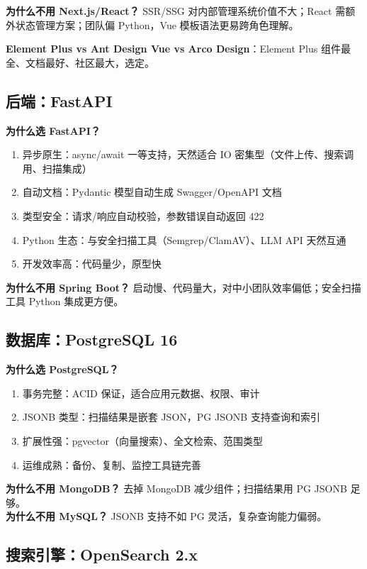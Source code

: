 \documentclass[11pt,a4paper]{article}
\begin{document}
\textbf{为什么不用 Next.js/React？} SSR/SSG 对内部管理系统价值不大；React 需额外状态管理方案；团队偏 Python，Vue 模板语法更易跨角色理解。

\textbf{Element Plus vs Ant Design Vue vs Arco Design}：Element Plus 组件最全、文档最好、社区最大，选定。

\subsection{后端：FastAPI}

\textbf{为什么选 FastAPI？}

\begin{enumerate}[nosep]
  \item 异步原生：async/await 一等支持，天然适合 IO 密集型（文件上传、搜索调用、扫描集成）
  \item 自动文档：Pydantic 模型自动生成 Swagger/OpenAPI 文档
  \item 类型安全：请求/响应自动校验，参数错误自动返回 422
  \item Python 生态：与安全扫描工具（Semgrep/ClamAV）、LLM API 天然互通
  \item 开发效率高：代码量少，原型快
\end{enumerate}

\textbf{为什么不用 Spring Boot？} 启动慢、代码量大，对中小团队效率偏低；安全扫描工具 Python 集成更方便。

\subsection{数据库：PostgreSQL 16}

\textbf{为什么选 PostgreSQL？}

\begin{enumerate}[nosep]
  \item 事务完整：ACID 保证，适合应用元数据、权限、审计
  \item JSONB 类型：扫描结果是嵌套 JSON，PG JSONB 支持查询和索引
  \item 扩展性强：pgvector（向量搜索）、全文检索、范围类型
  \item 运维成熟：备份、复制、监控工具链完善
\end{enumerate}

\textbf{为什么不用 MongoDB？} 去掉 MongoDB 减少组件；扫描结果用 PG JSONB 足够。\\
\textbf{为什么不用 MySQL？} JSONB 支持不如 PG 灵活，复杂查询能力偏弱。

\subsection{搜索引擎：OpenSearch 2.x}
\end{document}
